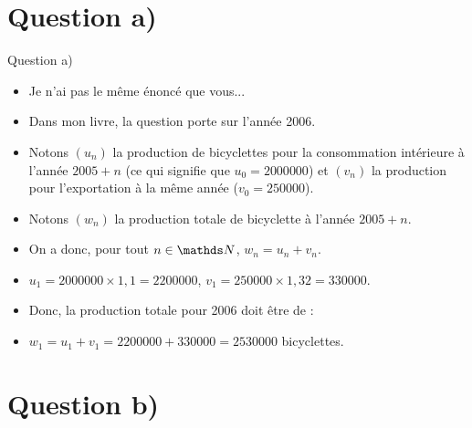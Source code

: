\section{Question a)}
\begin{frame}{Question a)}

\begin{itemize}
 	
	\item Je n'ai pas le même énoncé que vous...
	
	\item Dans mon livre, la question porte sur l'année 2006.
	
	\item Notons $(u_n)$ la production de bicyclettes pour la consommation intérieure à l'année $2005+n$ (ce qui signifie que $u_0=2 000 000$) et $(v_n)$ la production pour l'exportation à la même année ($v_0=250 000$).
	
	\item Notons $(w_n)$ la production totale de bicyclette à l'année $2005+n$.
	
	\item On a donc, pour tout $n \in \N$, $w_n=u_n+v_n$.
	
	\item $u_1=2 000 000 \times 1,1 = 2 200 000$, $v_1=250 000 \times 1,32 = 330 000$.
	
	\item Donc, la production totale pour 2006 doit être de :
	
	\item $w_1=u_1+v_1=2 200 000+330 000=2 530 000$ bicyclettes.
	
	\end{itemize}
\end{frame}


\section{Question b)}

